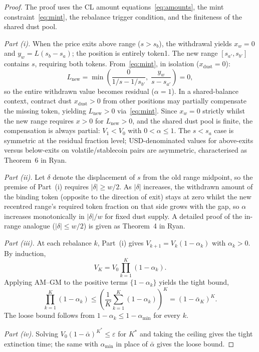 \documentclass[11pt,a4paper]{article}
\begin{document}
\begin{proof}
The proof uses the CL amount equations~\eqref{eq:amounts}, the mint constraint~\eqref{eq:mint}, the rebalance trigger condition, and the finiteness of the shared dust pool.

\emph{Part (i).} When the price exits above range ($s > s_b$), the withdrawal yields $x_w = 0$ and $y_w = L(s_b - s_a)$; the position is entirely token1. The new range $[s_{a'}, s_{b'}]$ contains $s$, requiring both tokens. From~\eqref{eq:mint}, in isolation ($x_{\text{dust}} = 0$):
\begin{equation}\label{eq:newliq}
L_{\text{new}} = \min\!\left(\frac{0}{1/s - 1/s_{b'}}, \; \frac{y_w}{s - s_{a'}}\right) = 0,
\end{equation}
so the entire withdrawn value becomes residual ($\alpha = 1$). In a shared-balance context, contract dust $x_{\text{dust}} > 0$ from other positions may partially compensate the missing token, yielding $L_{\text{new}} > 0$ via~\eqref{eq:mint}. Since $x_w = 0$ strictly whilst the new range requires $x > 0$ for $L_{\text{new}} > 0$, and the shared dust pool is finite, the compensation is always partial: $V_1 < V_0$ with $0 < \alpha \leq 1$. The $s < s_a$ case is symmetric at the residual fraction level; USD-denominated values for above-exits versus below-exits on volatile/stablecoin pairs are asymmetric, characterised as Theorem~6 in Ryan\cite{ryan2026b}.

\emph{Part (ii).} Let $\delta$ denote the displacement of $s$ from the old range midpoint, so the premise of Part~(i) requires $|\delta| \geq w/2$. As $|\delta|$ increases, the withdrawn amount of the binding token (opposite to the direction of exit) stays at zero whilst the new recentred range's required token fraction on that side grows with the gap, so $\alpha$ increases monotonically in $|\delta|/w$ for fixed dust supply. A detailed proof of the in-range analogue ($|\delta| \leq w/2$) is given as Theorem~4 in Ryan\cite{ryan2026b}.

\emph{Part (iii).} At each rebalance $k$, Part~(i) gives $V_{k+1} = V_k(1 - \alpha_k)$ with $\alpha_k > 0$. By induction,
\[
V_K = V_0 \prod_{k=1}^{K}(1 - \alpha_k).
\]
Applying AM--GM to the positive terms $\{1 - \alpha_k\}$ yields the tight bound,
\[
\prod_{k=1}^{K}(1 - \alpha_k) \leq \left(\frac{1}{K}\sum_{k=1}^{K}(1 - \alpha_k)\right)^{K} = (1 - \bar\alpha_K)^K.
\]
The loose bound follows from $1 - \alpha_k \leq 1 - \alpha_{\min}$ for every $k$.

\emph{Part (iv).} Solving $V_0(1 - \bar\alpha)^{K^*} \leq \varepsilon$ for $K^*$ and taking the ceiling gives the tight extinction time; the same with $\alpha_{\min}$ in place of $\bar\alpha$ gives the loose bound.
\end{proof}
\end{document}
